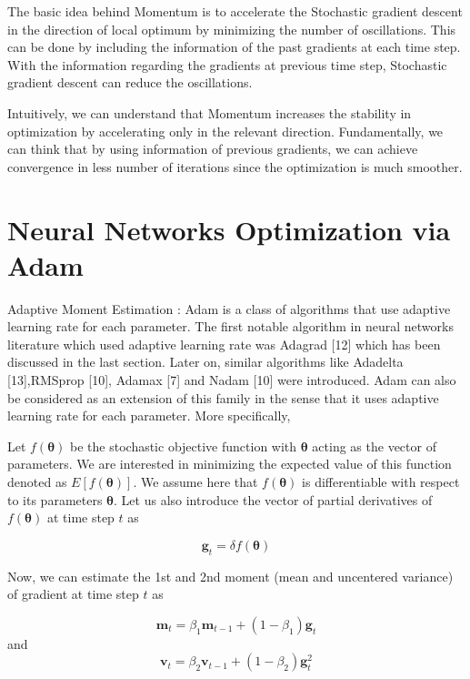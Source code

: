 The basic idea behind Momentum is to accelerate the Stochastic gradient descent in the direction of local optimum by minimizing the number of oscillations. This can be done by including the information of the past gradients at each time step. With the information regarding the gradients at previous time step, Stochastic gradient descent can reduce the oscillations. 

Intuitively, we can understand that Momentum increases the stability in optimization by accelerating only in the relevant direction. Fundamentally, we can think that by using information of previous gradients, we can achieve convergence in less number of iterations since the optimization is much smoother. 

\section {Neural Networks Optimization via Adam}

Adaptive Moment Estimation : Adam is a class of algorithms that use adaptive learning rate for each parameter. The first notable algorithm in neural networks literature which used adaptive learning rate was Adagrad [12] which has been discussed in the last section. Later on, similar algorithms like Adadelta [13],RMSprop [10], Adamax [7] and Nadam [10] were introduced. Adam can also be considered as an extension of this family in the sense that it uses adaptive learning rate for each parameter. More specifically,

Let $f(\bm{\theta})$ be the stochastic objective function with $\bm{\theta}$ acting as the vector of parameters. We are interested in minimizing the expected value of this function denoted as $E[f(\bm{\theta})]$. We assume here that $f(\bm{\theta})$ is differentiable with respect to its parameters 
$\bm{\theta}$. Let us also introduce the vector of partial derivatives of $f(\bm{\theta})$ at time step 
$t$ as 

\begin{equation}
\textbf{g}_t = \delta f(\bm{\theta})
\end{equation} 

Now, we can estimate the 1st and 2nd moment (mean and uncentered variance) of gradient at time step $t$ as 

\begin{equation}
\textbf{m}_t = \beta_{1} \textbf{m}_{t-1} + (1-\beta_{1}) \textbf{g}_t
\end{equation}
and
\begin{equation}
\textbf{v}_t = \beta_{2} \textbf{v}_{t-1} + (1-\beta_{2}) \textbf{g}_t^2
\end{equation}

